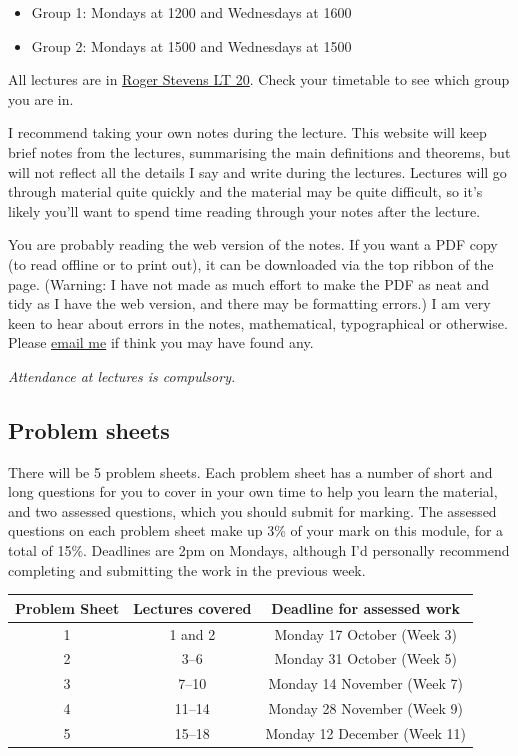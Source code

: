 \documentclass[
  a4paper,
]{book}
\providecommand{\tightlist}{%
  \setlength{\itemsep}{0pt}\setlength{\parskip}{0pt}}
\theoremstyle{definition}
\theoremstyle{definition}
\theoremstyle{definition}
\theoremstyle{definition}
\theoremstyle{remark}
\begin{document}
\begin{itemize}
\tightlist
\item
  Group 1: Mondays at 1200 and Wednesdays at 1600
\item
  Group 2: Mondays at 1500 and Wednesdays at 1500
\end{itemize}

All lectures are in \href{https://students.leeds.ac.uk/rooms?type=room\&id=100044}{Roger Stevens LT 20}. Check your timetable to see which group you are in.

I recommend taking your own notes during the lecture. This website will keep brief notes from the lectures, summarising the main definitions and theorems, but will not reflect all the details I say and write during the lectures. Lectures will go through material quite quickly and the material may be quite difficult, so it's likely you'll want to spend time reading through your notes after the lecture.

You are probably reading the web version of the notes. If you want a PDF copy (to read offline or to print out), it can be downloaded via the top ribbon of the page. (Warning: I have not made as much effort to make the PDF as neat and tidy as I have the web version, and there may be formatting errors.) I am very keen to hear about errors in the notes, mathematical, typographical or otherwise. Please \href{mailto:m.aldridge@leeds.ac.uk}{email me} if think you may have found any.

\emph{Attendance at lectures is compulsory.}

\hypertarget{problem-sheets}{%
\subsection*{Problem sheets}\label{problem-sheets}}

There will be 5 problem sheets. Each problem sheet has a number of short and long questions for you to cover in your own time to help you learn the material, and two assessed questions, which you should submit for marking. The assessed questions on each problem sheet make up 3\% of your mark on this module, for a total of 15\%. Deadlines are 2pm on Mondays, although I'd personally recommend completing and submitting the work in the previous week.

\begin{longtable}[]{@{}ccc@{}}
\toprule()
Problem Sheet & Lectures covered & Deadline for assessed work \\
\midrule()
\endhead
1 & 1 and 2 & Monday 17 October (Week 3) \\
2 & 3--6 & Monday 31 October (Week 5) \\
3 & 7--10 & Monday 14 November (Week 7) \\
4 & 11--14 & Monday 28 November (Week 9) \\
5 & 15--18 & Monday 12 December (Week 11) \\
\bottomrule()
\end{longtable}
\end{document}
